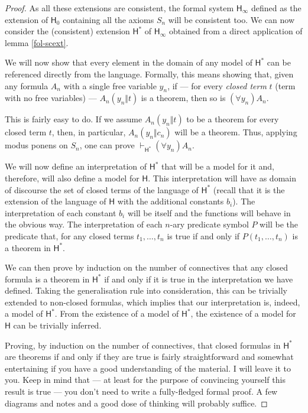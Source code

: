 \begin{proof}
As all these extensions are consistent, the formal system $\mathsf{H}_\infty$ defined as the extension of $\mathsf{H}_0$ containing all the axioms $S_n$ will be consistent too.
We can now consider the (consistent) extension $\mathsf{H}^*$ of $\mathsf{H}_\infty$ obtained from a direct application of lemma \ref{fol-scext}.

We will now show that every element in the domain of any model of $\mathsf{H}^*$ can be referenced directly from the language.
Formally, this means showing that, given any formula $A_n$ with a single free variable $y_n$, if --- for every \emph{closed term} $t$ (term with no free variables) --- $A_n(y_n\Vert t)$ is a theorem, then so is $(\forall y_n) A_n$.

This is fairly easy to do. If we assume $A_n(y_n\Vert t)$ to be a theorem for every closed term $t$, then, in particular, $A_n(y_n\Vert c_n)$ will be a theorem. Thus, applying modus ponens on $S_n$, one can prove $\vdash_{\mathsf{H}^*} (\forall y_n) A_n$.

We will now define an interpretation of $\mathsf{H}^*$ that will be a model for it and, therefore, will also define a model for $\mathsf{H}$. This interpretation will have as domain of discourse the set of closed terms of the language of $\mathsf{H}^*$ (recall that it is the extension of the language of $\mathsf{H}$ with the additional constants $b_i$).
The interpretation of each constant $b_i$ will be itself and the functions will behave in the obvious way.
The interpretation of each $n$-ary predicate symbol $P$ will be the predicate that, for any closed terms $t_1,\ldots,t_n$ is true if and only if $P(t_1,\ldots,t_n)$ is a theorem in $\mathsf{H}^*$. 

We can then prove by induction on the number of connectives that any closed formula is a theorem in $\mathsf{H}^*$ if and only if it is true in the interpretation we have defined.
Taking the generalisation rule into consideration, this can be trivially extended to non-closed formulas, which implies that our interpretation is, indeed, a model of $\mathsf{H}^*$.
From the existence of a model of $\mathsf{H}^*$, the existence of a model for $\mathsf{H}$ can be trivially inferred.

Proving, by induction on the number of connectives, that closed formulas in $\mathsf{H}^*$ are theorems if and only if they are true is fairly straightforward and somewhat entertaining if you have a good understanding of the material. I will leave it to you.
Keep in mind that --- at least for the purpose of convincing yourself this result is true --- you don't need to write a fully-fledged formal proof.
A few diagrams and notes and a good dose of thinking will probably suffice.
\end{proof}
